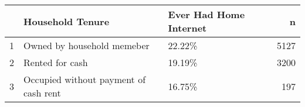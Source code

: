 \begin{table}[ht]
\centering
\begin{tabular}{rllr}
  \hline
 & Household Tenure & Ever Had Home Internet & n \\ 
  \hline
1 & Owned by household memeber & 22.22\% & 5127 \\ 
  2 & Rented for cash & 19.19\% & 3200 \\ 
  3 & Occupied without payment of cash rent & 16.75\% & 197 \\ 
   \hline
\end{tabular}
\end{table}

